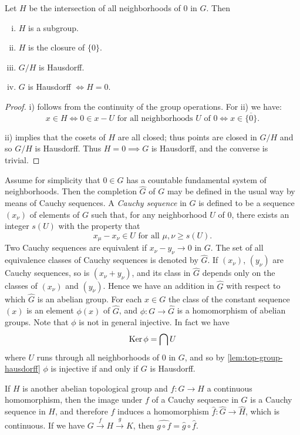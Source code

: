 \begin{lemma}\label{lem:top-group-hausdorff}
Let $H$ be the intersection of all neighborhoods of $0$ in $G$. Then
\begin{enumerate}[i)]
    \item $H$ is a subgroup.
    \item $H$ is the closure of $\{0\}$.
    \item $G/H$ is Hausdorff.
    \item $G$ is Hausdorff $\iff H = 0$.
\end{enumerate}
\end{lemma}

\begin{proof}
i) follows from the continuity of the group operations. For ii) we have:
\[
    x \in H \iff 0 \in x - U \text{ for all neighborhoods } U \text{ of } 0 \iff x \in \overline{\{0\}}.
\]

ii) implies that the cosets of $H$ are all closed; thus points are closed in $G/H$ and so $G/H$ is Hausdorff. Thus $H = 0 \implies G$ is Hausdorff, and the converse is trivial.
\end{proof}

Assume for simplicity that $0 \in G$ has a countable fundamental system of neighborhoods. Then the completion $\widehat{G}$ of $G$ may be defined in the usual way by means of Cauchy sequences. A \emph{Cauchy sequence} in $G$ is defined to be a sequence $(x_\nu)$ of elements of $G$ such that, for any neighborhood $U$ of $0$, there exists an integer $s(U)$ with the property that
\[
    x_\mu - x_\nu \in U \text{ for all } \mu, \nu \geq s(U).
\]
Two Cauchy sequences are equivalent if $x_\nu - y_\nu \to 0$ in $G$. The set of all equivalence classes of Cauchy sequences is denoted by $\widehat{G}$. If $(x_\nu)$, $(y_\nu)$ are Cauchy sequences, so is $(x_\nu + y_\nu)$, and its class in $\widehat{G}$ depends only on the classes of $(x_\nu)$ and $(y_\nu)$. Hence we have an addition in $\widehat{G}$ with respect to which $\widehat{G}$ is an abelian group. For each $x \in G$ the class of the constant sequence $(x)$ is an element $\phi(x)$ of $\widehat{G}$, and $\phi \colon G \to \widehat{G}$ is a homomorphism of abelian groups. Note that $\phi$ is not in general injective. In fact we have
\[
    \operatorname{Ker} \phi = \bigcap U
\]
where $U$ runs through all neighborhoods of $0$ in $G$, and so by \eqref{lem:top-group-hausdorff} $\phi$ is injective if and only if $G$ is Hausdorff.

If $H$ is another abelian topological group and $f \colon G \to H$ a continuous homomorphism, then the image under $f$ of a Cauchy sequence in $G$ is a Cauchy sequence in $H$, and therefore $f$ induces a homomorphism $\widehat{f} \colon \widehat{G} \to \widehat{H}$, which is continuous. If we have $G \xrightarrow{f} H \xrightarrow{g} K$, then $\widehat{g \circ f} = \widehat{g} \circ \widehat{f}$.

